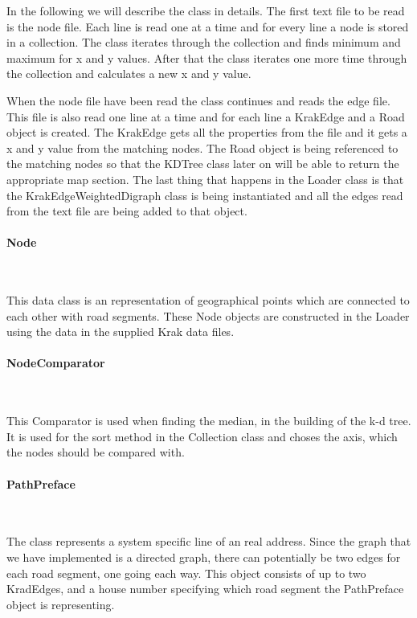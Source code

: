 \documentclass[a4paper,10pt,titlepage]{article}
\begin{document}
In the following we will describe the class in details. The first text file to be read is the node file. Each line is read one at a time and for every line a node is stored in a collection. The class iterates through the collection and finds minimum and maximum for x and y values. After that the class iterates one more time through the collection and calculates a new x and y value.  

When the node file have been read the class continues and reads the edge file. This file is also read one line at a time and for each line a KrakEdge and a Road object is created. The KrakEdge gets all the properties from the file and it gets a x and y value from the matching nodes. The Road object is being referenced to the matching nodes so that the KDTree class later on will be able to return the appropriate map section. The last thing that happens in the Loader class is that the KrakEdgeWeightedDigraph class is being instantiated and all the edges read from the text file are being added to that object. 

				\paragraph{Node}\mbox{}\
				
				This data class is an representation of geographical points which are connected to each other with road segments. These Node objects are constructed in the Loader using the data in the supplied Krak data files. 
				
				\paragraph{NodeComparator}\mbox{}\
				
This Comparator is used when finding the median, in the building of the k-d tree. It is used for the sort method in the Collection class and choses the axis, which the nodes should be compared with.

				\paragraph{PathPreface}\mbox{}\
				
The class represents a system specific line of an real address. Since the graph that we have implemented is a directed graph, there can potentially be two edges for each road segment, one going each way. This object consists of up to two KradEdges, and a house number specifying which road segment the PathPreface object is representing.
\end{document}
